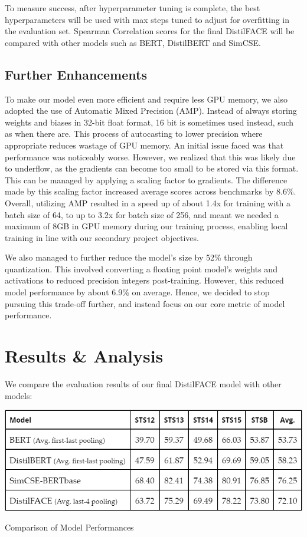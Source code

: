 \documentclass[10pt,twocolumn,letterpaper]{article}
\begin{document}
To measure success, after hyperparameter tuning is complete, the best hyperparameters will be used with max steps tuned to adjust for overfitting in the evaluation set. Spearman Correlation scores for the final DistilFACE will be compared with other models such as BERT, DistilBERT and SimCSE. 

\subsection{Further Enhancements}

To make our model even more efficient and require less GPU memory, we also adopted the use of Automatic Mixed Precision (AMP). Instead of always storing weights and biases in 32-bit float format, 16 bit is sometimes used instead, such as when there are. This process of autocasting to lower precision where appropriate reduces wastage of GPU memory. An initial issue faced was that performance was noticeably worse. However, we realized that this was likely due to underflow, as the gradients can become too small to be stored via this format. This can be managed by applying a scaling factor to gradients. The difference made by this scaling factor increased average scores across benchmarks by 8.6\%. Overall, utilizing AMP resulted in a speed up of about 1.4x for training with a batch size of 64, to up to 3.2x for batch size of 256, and meant we needed a maximum of 8GB in GPU memory during our training process, enabling local training in line with our secondary project objectives.

We also managed to further reduce the model's size by 52\% through quantization. This involved converting a floating point model’s weights and activations to reduced precision integers post-training.  However, this reduced model performance by about 6.9\% on average. Hence, we decided to stop pursuing this trade-off further, and instead focus on our core metric of model performance.


\section{Results \& Analysis}

We compare the evaluation results of our final DistilFACE model with other models:

\begin{table}[hbt!]
\centering
\includegraphics[scale=0.4]{images/Results-Compare-Models.png}
\caption{Comparison of Model Performances}
\label{fig:short}
\end{table}
\end{document}
